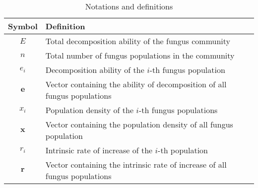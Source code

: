\begin{table}[h]
    \begin{center}
        \caption{Notations and definitions}
        \begin{tabular}{cl}
            \toprule
            Symbol           & Definition                                                                 \\
            \midrule
            $E$              & Total decomposition ability of the fungus community                        \\
            $n$              & Total number of fungus populations in the community                        \\
            $e_i$            & Decomposition ability of the $i$-th fungus population                      \\
            $\boldsymbol{e}$ & Vector containing the ability of decomposition of all fungus populations   \\
            $x_i$            & Population density of the $i$-th fungus populations                        \\
            $\boldsymbol{x}$ & Vector containing the population density of all fungus population          \\
            $r_i$            & Intrinsic rate of increase of the $i$-th population                        \\
            $\boldsymbol{r}$ & Vector containing the intrinsic rate of increase of all fungus populations \\
            \bottomrule
        \end{tabular}
    \end{center}
\end{table}